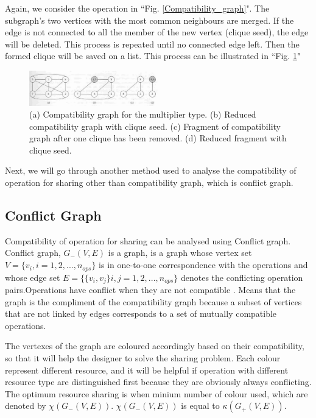 Again, we consider the operation in ``Fig. \ref{Compatibility_graph}". The subgraph's two vertices with the most common neighbours are merged. If the edge is not connected to all the member of the new vertex (clique seed), the edge will be deleted. This process is repeated until no connected edge left. Then the formed clique will be saved on a list.  This process can be illustrated in ``Fig. \ref{Comparibility_graph_mux_2}"

\begin{figure}[h]
    \centering
    \includegraphics[width=0.5\textwidth]{Comparibility_graph_mux_2}
    \caption{ (a) Compatibility graph for the multiplier type. (b) Reduced compatibility graph with clique seed. (c) Fragment of compatibility graph after one clique has been removed. (d) Reduced fragment with clique seed. \cite{main}}
    \label{Comparibility_graph_mux_2}
\end{figure}

Next, we will go through  another method used to analyse the compatibility of operation for sharing other than compatibility graph, which is conflict graph.


\subsection{Conflict Graph}

Compatibility of operation for sharing can be analysed using Conflict graph. Conflict graph, $G_{-}(V, E)$ is a graph, is a graph whose vertex set $ V = \{ v_{i}, i = 1, 2, ..., n_{ops}\}$ is in one-to-one correspondence with the operations and whose edge set $E = \{\{v_{i},v_{j}\} i, j = 1, 2, ...,n_{ops}\}$ denotes the conflicting operation pairs.Operations have conflict when they are not compatible \cite{main}. Means that the graph is the compliment of the compatibility graph because a subset of vertices that are not linked by edges corresponds to a set of mutually compatible operations.

The vertexes of the graph are coloured accordingly based on their compatibility, so that it will help the designer to solve the sharing problem. Each colour represent different resource, and it will be helpful if operation with different resource type are distinguished first because they are obviously always conflicting. The optimum resource sharing is when minium number of colour used, which are denoted by $\chi(G_{-}(V, E))$.  $\chi(G_{-}(V, E))$ is equal to $\kappa(G_{+}(V, E))$.

